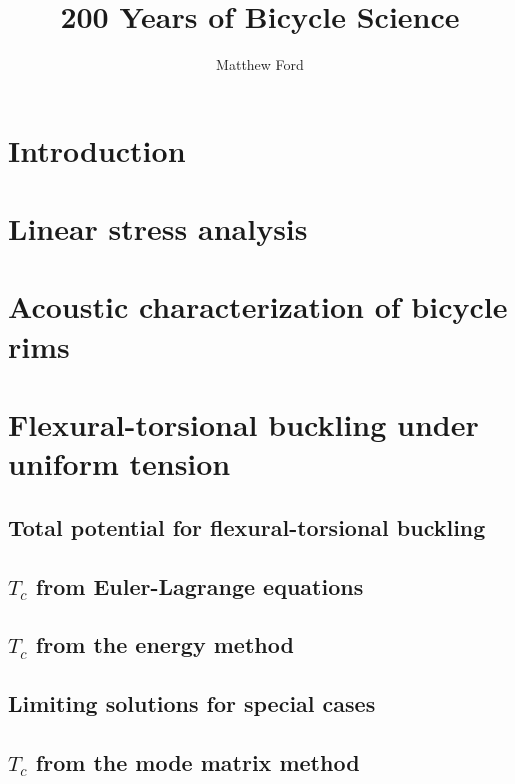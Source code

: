 \documentclass{nuthesis}
\begin{document}
\title{200 Years of Bicycle Science}
\author{Matthew Ford}

\maketitle


\tableofcontents


\chapter{Introduction}

\label{introduction}


\chapter{Linear stress analysis}

\label{stress_analysis}


\chapter{Acoustic characterization of bicycle rims}

\label{acoustic_testing}


\chapter{Flexural-torsional buckling under uniform tension}
\section{Total potential for flexural-torsional buckling}
\section{$T_c$ from Euler-Lagrange equations}
\section{$T_c$ from the energy method}
\section{Limiting solutions for special cases}
\section{$T_c$ from the mode matrix method}
\end{document}
